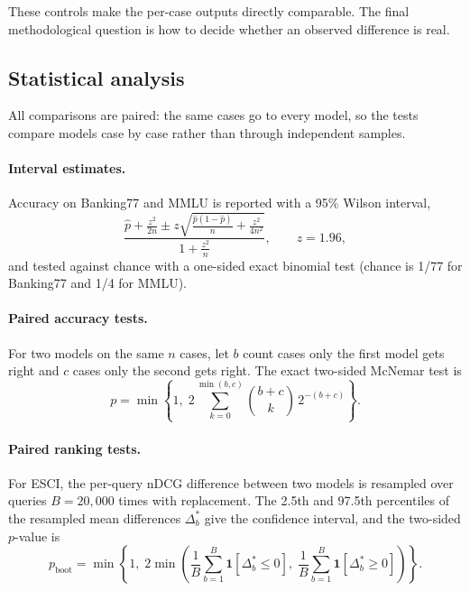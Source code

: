 \documentclass[11pt,a4paper]{article}
\begin{document}
These controls make the per-case outputs directly comparable. The final methodological question is
how to decide whether an observed difference is real.

\subsection{Statistical analysis}\label{sec:stats}

All comparisons are paired: the same cases go to every model, so the tests compare models case by case
rather than through independent samples.

\paragraph{Interval estimates.} Accuracy on Banking77 and MMLU is reported with a 95\% Wilson interval,
\begin{equation}\label{eq:wilson}
  \frac{\hat{p} + \frac{z^2}{2n} \pm z\sqrt{\frac{\hat{p}(1-\hat{p})}{n} + \frac{z^2}{4n^2}}}{1 + \frac{z^2}{n}},
  \qquad z = 1.96,
\end{equation}
and tested against chance with a one-sided exact binomial test (chance is 1/77 for Banking77 and 1/4 for
MMLU).

\paragraph{Paired accuracy tests.} For two models on the same $n$ cases, let $b$ count cases only the
first model gets right and $c$ cases only the second gets right. The exact two-sided McNemar test is
\begin{equation}\label{eq:mcnemar}
  p = \min\left\{1,\; 2 \sum_{k=0}^{\min(b,c)} \binom{b+c}{k}\, 2^{-(b+c)}\right\}.
\end{equation}

\paragraph{Paired ranking tests.} For ESCI, the per-query nDCG difference between two models is
resampled over queries $B = 20{,}000$ times with replacement. The 2.5th and 97.5th percentiles of the
resampled mean differences $\Delta^{*}_{b}$ give the confidence interval, and the two-sided $p$-value is
\begin{equation}\label{eq:bootp}
  p_{\text{boot}} = \min\left\{1,\; 2\min\left(\frac{1}{B}\sum_{b=1}^{B} \mathbf{1}[\Delta^{*}_{b} \le 0],\;
  \frac{1}{B}\sum_{b=1}^{B} \mathbf{1}[\Delta^{*}_{b} \ge 0]\right)\right\}.
\end{equation}
\end{document}
